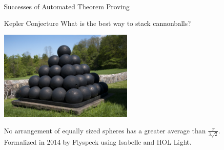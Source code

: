 
\begin{frame}{Successes of Automated Theorem Proving}
	\begin{block}{Kepler Conjecture}
		What is the best way to stack cannonballs?
		\bigskip
		\begin{center}
				\includegraphics[width=0.5\textwidth]{figures/balls.jpg}\\
				\centering \color{gray}{Nedral (CC by-nc-sa 2.5)}
		\end{center}
		
		\small{
				No arrangement of equally sized spheres has a greater average than $\frac{\pi}{3\sqrt{2}}$.
				Formalized in 2014 by Flyspeck using Isabelle and HOL Light.
        }
        
	\end{block}
\end{frame}

